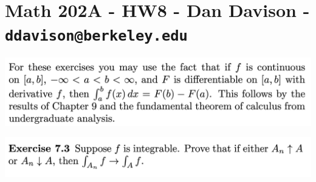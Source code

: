 \section*{Math 202A - HW8 - Dan Davison - \texttt{ddavison@berkeley.edu}}
\begin{mdframed}
\includegraphics[width=400pt]{img/analysis--berkeley-202a-hw08-518d.png}
\end{mdframed}

\begin{mdframed}
\includegraphics[width=400pt]{img/analysis--berkeley-202a-hw08-2798.png}
\end{mdframed}

